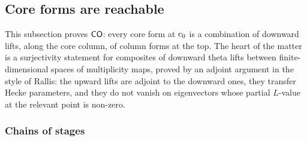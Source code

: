 \subsection{Core forms are reachable}\label{sec:pf:fs:onto}

This subsection proves $\mathsf{CO}$: every core form at $\mathrm{c}_0$ is a combination of downward lifts, along the core column, of
column forms at the top. The heart of the matter is a surjectivity statement for composites of downward theta lifts between
finite-dimensional spaces of multiplicity maps, proved by an adjoint argument in the style of Rallis: the upward lifts are adjoint to
the downward ones, they transfer Hecke parameters, and they do not vanish on eigenvectors whose partial $L$-value at the relevant
point is non-zero.

\subsubsection{Chains of stages}

